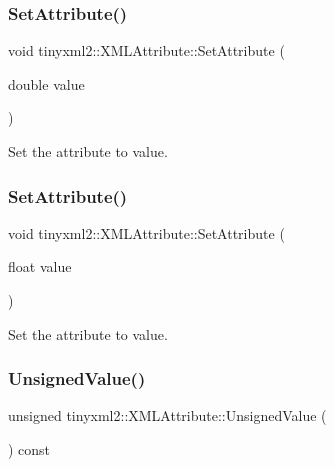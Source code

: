 \subsubsection{\texorpdfstring{Set\+Attribute()}{SetAttribute()}\hspace{0.1cm}{\footnotesize\ttfamily [6/7]}}
{\footnotesize\ttfamily void tinyxml2\+::\+X\+M\+L\+Attribute\+::\+Set\+Attribute (\begin{DoxyParamCaption}\item[{double}]{value }\end{DoxyParamCaption})}



Set the attribute to value. 

\mbox{\label{classtinyxml2_1_1_x_m_l_attribute_ae95e843313aaf5d56c32530b6456df02}} 
\subsubsection{\texorpdfstring{Set\+Attribute()}{SetAttribute()}\hspace{0.1cm}{\footnotesize\ttfamily [7/7]}}
{\footnotesize\ttfamily void tinyxml2\+::\+X\+M\+L\+Attribute\+::\+Set\+Attribute (\begin{DoxyParamCaption}\item[{float}]{value }\end{DoxyParamCaption})}



Set the attribute to value. 

\mbox{\label{classtinyxml2_1_1_x_m_l_attribute_a0be5343b08a957c42c02c5d32c35d338}} 
\subsubsection{\texorpdfstring{Unsigned\+Value()}{UnsignedValue()}}
{\footnotesize\ttfamily unsigned tinyxml2\+::\+X\+M\+L\+Attribute\+::\+Unsigned\+Value (\begin{DoxyParamCaption}{ }\end{DoxyParamCaption}) const\hspace{0.3cm}{\ttfamily [inline]}}



